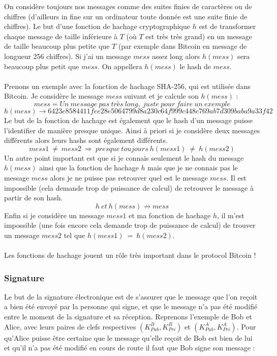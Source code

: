 \documentclass[11pt,a4paper]{article}
\begin{document}
On considère toujours nos messages comme des suites finies de caractères ou de chiffres (d'ailleurs in fine sur un ordinateur toute donnée est une suite finie de chiffres). Le but d'une fonction de hachage cryptographique $h$ est de transformer chaque message de taille inférieure à $T$ (où $T$ est très très grand) en un message de taille beaucoup plus petite que $T$ (par exemple dans Bitcoin en message de longueur 256 chiffres). Si j'ai un message $mess$ assez long alors $h(mess)$ sera beaucoup plus petit que $mess$. On appellera $h(mess)$ le hash de $mess$. \\\\
Prenons un exemple avec la fonction de hachage SHA-256, qui est utilisée dans Bitcoin. Je considère le message $mess$ suivant et je calcule son $h(mess)$ : 
$$mess = Un~message~pas~très ~long, ~juste ~pour ~faire ~un ~exemple $$
$$h(mess) \rightarrow 6423e8584411fee28e5064799d8a230c64f999c448c769ab7d309baba9a33f42$$
Le but de la fonction de hachage est également que le hash d'un message puisse l'identifier de manière presque unique. Ainsi à priori si je considère deux messages différents alors leurs hashs sont également différents.  
$$mess1~ \neq ~mess2~ \Rightarrow ~presque~ toujours~ h(mess1)~ \neq ~h(mess2)$$
Un autre point important est que si je connais seulement le hash du message $h(mess)$ ainsi que la fonction de hachage $h$ mais que je ne connais pas le message $mess$ alors je ne puisse pas retrouver quel est le message $mess$. Il est impossible (cela demande trop de puissance de calcul) de retrouver le message à partir de son hash.
$$ h~ et ~h(mess) \nrightarrow mess$$
Enfin si je considère un message $mess1$ et ma fonction de hachage $h$, il m'est impossible (une fois encore cela demande trop de puissance de calcul) de trouver un message $mess2$ tel que $h(mess1) ~=~ h(mess2)$.\\\\
Les fonctions de hachage jouent un rôle très important dans le protocol Bitcoin !

\subsubsection{Signature}

Le but de la signature électronique est de s'assurer que le message que l'on reçoit a bien été envoyé par la personne qui signe, et que le message n'a pas été modifié entre le moment de la signature et sa réception. Reprenons l'exemple de Bob et Alice, avec leurs paires de clefs respectives $(K_{Pub}^{B}, K_{Pri}^{B})$ et $(K_{Pub}^{A}, K_{Pri}^{A})$. Pour qu'Alice puisse être certaine que le message qu'elle reçoit de Bob est bien de lui et qu'il n'a pas été modifié en cours de route il faut que Bob signe son message :\\
\end{document}
